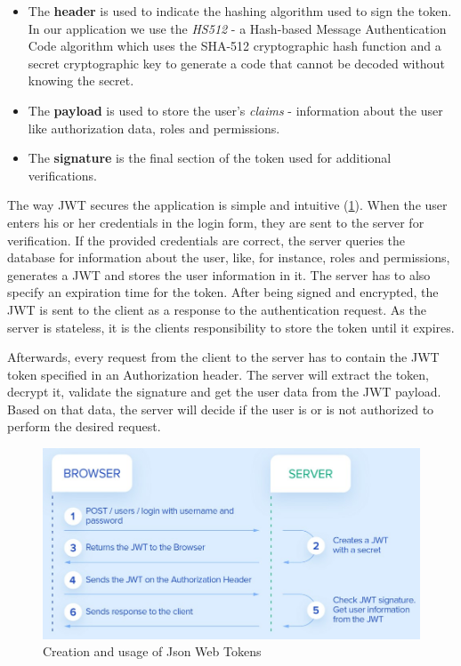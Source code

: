 \begin{itemize}
    \item The \textbf{header} is used to indicate the hashing algorithm used to sign the token. In our application we use the \textit{HS512} - a Hash-based Message Authentication Code algorithm which uses the SHA-512 cryptographic hash function and a secret cryptographic key to generate a code that cannot be decoded without knowing the secret.
    \item The \textbf{payload} is used to store the user's \textit{claims} - information about the user like authorization data, roles and permissions.
    \item The \textbf{signature} is the final section of the token used for additional verifications.
\end{itemize}

The way JWT secures the application is simple and intuitive (\ref{jwtFlow}). When the user enters his or her credentials in the login form, they are sent to the server for verification. If the provided credentials are correct, the server queries the database for information about the user, like, for instance, roles and permissions, generates a JWT and stores the user information in it. The server has to also specify an expiration time for the token. After being signed and encrypted, the JWT is sent to the client as a response to the authentication request. As the server is stateless, it is the clients responsibility to store the token until it expires.

Afterwards, every request from the client to the server has to contain the JWT token specified in an Authorization header. The server will extract the token, decrypt it, validate the signature and get the user data from the JWT payload. Based on that data, the server will decide if the user is or is not authorized to perform the desired request.

\begin{figure}[H]
    \centering
    \includegraphics[width=5in]{images/jwtFlow}
    \caption{Creation and usage of Json Web Tokens \cite{jwtFlow}}
    \label{jwtFlow}
\end{figure}


